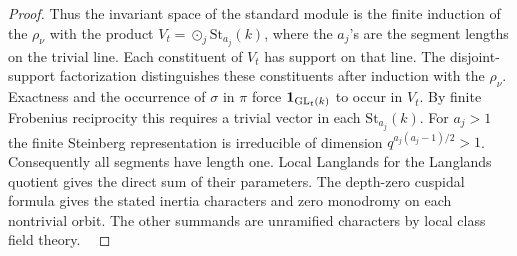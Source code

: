\documentclass[a4paper,11pt]{article}
\theoremstyle{definition}
\theoremstyle{remark}
\numberwithin{equation}{section}
\begin{document}
\begin{proof}
Thus the invariant space of the standard module is the finite
induction of the \(\rho_\nu\) with the product
\(V_t=\mathop{\odot}_j\mathrm{St}_{a_j}(k)\), where the
\(a_j\)'s are the segment lengths on the trivial line. Each
constituent of \(V_t\) has support on that line. The disjoint-support
factorization distinguishes these constituents after induction
with the \(\rho_\nu\). Exactness and the occurrence of \(\sigma\)
in \(\pi\) force \({\bf1}_{\mathrm{GL}_t(k)}\) to occur in \(V_t\).
By finite Frobenius reciprocity this requires a trivial vector in
each \(\mathrm{St}_{a_j}(k)\). For \(a_j>1\) the finite Steinberg
representation is irreducible of dimension \(q^{a_j(a_j-1)/2}>1\).
Consequently all segments have length one. Local Langlands for the
Langlands quotient gives the direct sum of their parameters.
The depth-zero cuspidal formula gives the stated inertia characters
and zero monodromy on each nontrivial orbit. The other summands
are unramified characters by local class field theory.
~\cite[Prop.~2.4.1(i)]{III-II-egh801}
\end{proof}
\end{document}
